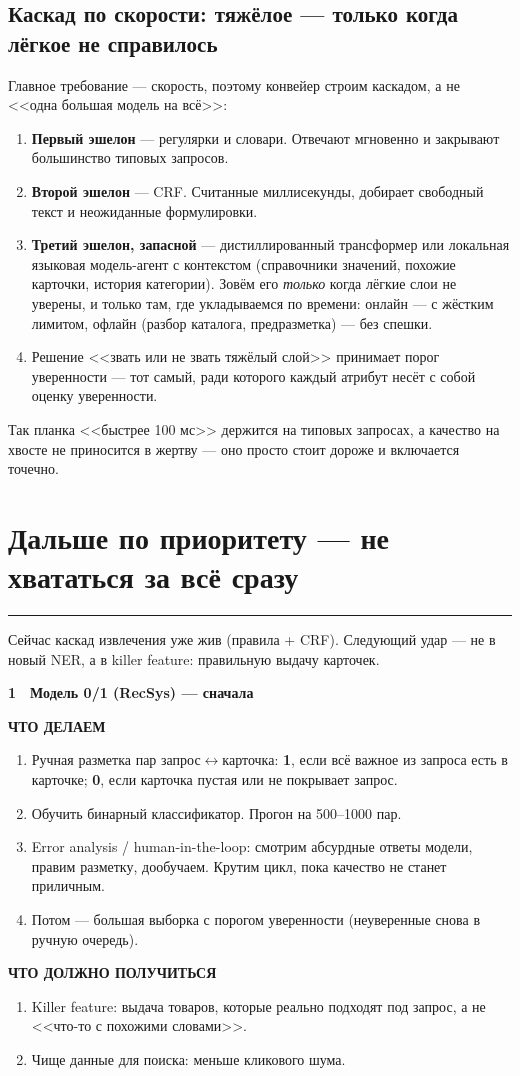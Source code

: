 \documentclass[11pt,a4paper]{article}
\newcommand{\secrule}{%
  \par\vspace{4pt}%
  {\color{mvred}\noindent\rule{\linewidth}{0.9pt}\par}%
  \vspace{8pt}%
}
\newcommand{\daysection}[1]{%
  \Needspace{22\baselineskip}%
  \section{#1}\secrule
}
\newcommand{\dayblock}[4]{%
  \begin{tcolorbox}[
    enhanced,
    colback=white,
    colframe=rulec,
    boxrule=0.65pt,
    arc=2pt,
    left=8pt,
    right=8pt,
    top=8pt,
    bottom=8pt,
    before skip=3pt,
    after skip=11pt,
  ]
  {\color{mvred}\bfseries #1}~~{\bfseries #2}\par\vspace{4pt}%
  {\scriptsize\bfseries\color{inksoft}ЧТО ДЕЛАЕМ}\par\vspace{1pt}%
  #3\par\vspace{5pt}%
  {\scriptsize\bfseries\color{mint}ЧТО ДОЛЖНО ПОЛУЧИТЬСЯ}\par\vspace{1pt}%
  #4%
  \end{tcolorbox}%
}
\begin{document}
\subsection*{Каскад по скорости: тяжёлое --- только когда лёгкое не справилось}
Главное требование --- скорость, поэтому конвейер строим каскадом, а не <<одна большая модель на всё>>:
\begin{enumerate}
  \item \textbf{Первый эшелон} --- регулярки и словари. Отвечают мгновенно и закрывают большинство типовых запросов.
  \item \textbf{Второй эшелон} --- CRF. Считанные миллисекунды, добирает свободный текст и неожиданные формулировки.
  \item \textbf{Третий эшелон, запасной} --- дистиллированный трансформер или локальная языковая модель-агент с контекстом (справочники значений, похожие карточки, история категории). Зовём его \emph{только} когда лёгкие слои не уверены, и только там, где укладываемся по времени: онлайн --- с жёстким лимитом, офлайн (разбор каталога, предразметка) --- без спешки.
  \item Решение <<звать или не звать тяжёлый слой>> принимает порог уверенности --- тот самый, ради которого каждый атрибут несёт с собой оценку уверенности.
\end{enumerate}
Так планка <<быстрее 100 мс>> держится на типовых запросах, а качество на хвосте не приносится в жертву --- оно просто стоит дороже и включается точечно.

\daysection{Дальше по приоритету --- не хвататься за всё сразу}
Сейчас каскад извлечения уже жив (правила + CRF). Следующий удар --- не в новый NER, а в killer feature: правильную выдачу карточек.

\dayblock{1}{Модель 0/1 (RecSys) --- сначала}{%
\begin{enumerate}
  \item Ручная разметка пар запрос$\leftrightarrow$карточка: \textbf{1}, если всё важное из запроса есть в карточке; \textbf{0}, если карточка пустая или не покрывает запрос.
  \item Обучить бинарный классификатор. Прогон на 500--1000 пар.
  \item Error analysis / human-in-the-loop: смотрим абсурдные ответы модели, правим разметку, дообучаем. Крутим цикл, пока качество не станет приличным.
  \item Потом --- большая выборка с порогом уверенности (неуверенные снова в ручную очередь).
\end{enumerate}
}{%
\begin{enumerate}
  \item Killer feature: выдача товаров, которые реально подходят под запрос, а не <<что-то с похожими словами>>.
  \item Чище данные для поиска: меньше кликового шума.
\end{enumerate}
}
\end{document}
